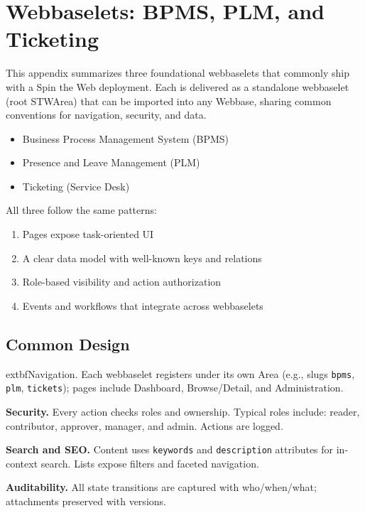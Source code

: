 
\chapter{Webbaselets: BPMS, PLM, and Ticketing}
\label{app:webbaselets}

This appendix summarizes three foundational webbaselets that commonly ship with a Spin the Web deployment. Each is delivered as a standalone webbaselet (root STWArea) that can be imported into any Webbase, sharing common conventions for navigation, security, and data.

\begin{itemize}
  \item Business Process Management System (BPMS)
  \item Presence and Leave Management (PLM)
  \item Ticketing (Service Desk)
\end{itemize}

All three follow the same patterns:
\begin{enumerate}
  \item Pages expose task-oriented UI
  \item A clear data model with well-known keys and relations
  \item Role-based visibility and action authorization
  \item Events and workflows that integrate across webbaselets
\end{enumerate}

\section{Common Design}
\label{sec:app-webbaselets-common}

	extbf{Navigation.} Each webbaselet registers under its own Area (e.g., slugs \texttt{bpms}, \texttt{plm}, \texttt{tickets}); pages include Dashboard, Browse/Detail, and Administration.

\textbf{Security.} Every action checks roles and ownership. Typical roles include: reader, contributor, approver, manager, and admin. Actions are logged.

\textbf{Search and SEO.} Content uses \texttt{keywords} and \texttt{description} attributes for in-context search. Lists expose filters and faceted navigation.

\textbf{Auditability.} All state transitions are captured with who/when/what; attachments preserved with versions.

